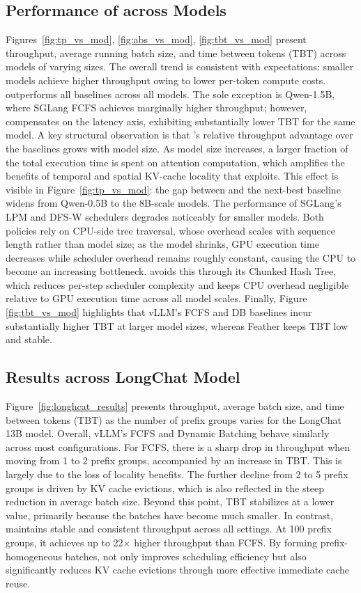 \subsection{Performance of \Feather across Models}
\label{subsec:across_models}
Figures~\ref{fig:tp_vs_mod}, \ref{fig:abs_vs_mod}, \ref{fig:tbt_vs_mod} present throughput, average running batch size, and time between tokens (TBT) across models of varying sizes. The overall trend is consistent with expectations: smaller models achieve higher throughput owing to lower per-token compute costs. \Feather outperforms all baselines across all models. The sole exception is Qwen-1.5B, where SGLang FCFS achieves marginally higher throughput; however, \Feather compensates on the latency axis, exhibiting substantially lower TBT for the same model. A key structural observation is that \Feather's relative throughput advantage over the baselines grows with model size. As model size increases, a larger fraction of the total execution time is spent on attention computation, which amplifies the benefits of temporal and spatial KV-cache locality that \Feather exploits. This effect is visible in Figure~\ref{fig:tp_vs_mod}: the gap between \Feather and the next-best baseline widens from Qwen-0.5B to the 8B-scale models. The performance of SGLang's LPM and DFS-W schedulers degrades noticeably for smaller models. Both policies rely on CPU-side tree traversal, whose overhead scales with sequence length rather than model size; as the model shrinks, GPU execution time decreases while scheduler overhead remains roughly constant, causing the CPU to become an increasing bottleneck. \Feather avoids this through its Chunked Hash Tree, which reduces per-step scheduler complexity and keeps CPU overhead negligible relative to GPU execution time across all model scales. Finally, Figure \ref{fig:tbt_vs_mod} highlights that vLLM's FCFS and DB baselines incur substantially higher TBT at larger model sizes, whereas Feather keeps TBT low and stable. 

\subsection{Results across LongChat Model}
\label{subsec:results_across_longchat_model}
Figure~\ref{fig:longhcat_results} presents throughput, average batch size, and time between tokens (TBT) as the number of prefix groups varies for the LongChat 13B model. Overall, vLLM's FCFS and Dynamic Batching behave similarly across most configurations. For FCFS, there is a sharp drop in throughput when moving from 1 to 2 prefix groups, accompanied by an increase in TBT. This is largely due to the loss of locality benefits. The further decline from 2 to 5 prefix groups is driven by KV cache evictions, which is also reflected in the steep reduction in average batch size. Beyond this point, TBT stabilizes at a lower value, primarily because the batches have become much smaller. In contrast, \Feather maintains stable and consistent throughput across all settings. At 100 prefix groups, it achieves up to 22$\times$ higher throughput than FCFS. By forming prefix-homogeneous batches, \Feather not only improves scheduling efficiency but also significantly reduces KV cache evictions through more effective immediate cache reuse.

